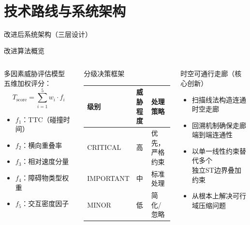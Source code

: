 \documentclass{beamer}
\begin{document}
\section{技术路线与系统架构}

\begin{frame}{改进后系统架构（三层设计）}
  \centering
  \vspace{-0.2em}
  
\end{frame}

\begin{frame}{改进算法概览}
  \begin{columns}[T]
    \begin{block}{多因素威胁评估模型}
      五维加权评分：
      \[
        T_{\mathrm{score}} = \sum_{i=1}^{5} w_i \cdot f_i
      \]
      \begin{itemize}
        \item $f_1$：TTC（碰撞时间）
        \item $f_2$：横向重叠率
        \item $f_3$：相对速度分量
        \item $f_4$：障碍物类型权重
        \item $f_5$：交互密度因子
      \end{itemize}
    \end{block}

    \begin{block}{分级决策框架}
      \small
      \begin{tabular}{@{}lll@{}}
        \toprule
        级别 & 威胁程度 & 处理策略 \\
        \midrule
        \alert{CRITICAL} & 高 & 优先，严格约束 \\
        IMPORTANT        & 中 & 标准处理 \\
        MINOR            & 低 & 简化/忽略 \\
        \bottomrule
      \end{tabular}
    \end{block}
    \vspace{0.4em}
    \begin{block}{时空可通行走廊（核心创新）}
      \begin{itemize}
        \item 扫描线法构造连通时空走廊
        \item 回溯机制确保走廊端到端连通性
        \item 以\alert{单一线性约束替代}多个\\
              独立ST边界叠加约束
        \item 从根本上解决可行域压缩问题
      \end{itemize}
    \end{block}
  \end{columns}
\end{frame}
\end{document}
